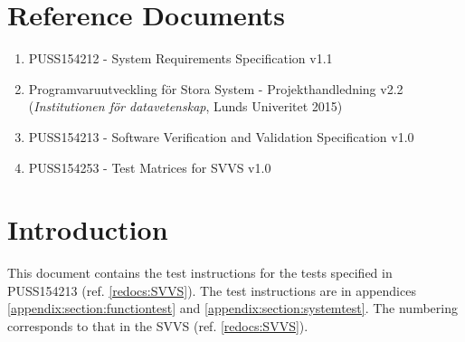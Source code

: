 \documentclass[a4paper]{article}
\begin{document}
\setcounter{tocdepth}{2}
\tableofcontents
\newpage
{}


\section{Reference Documents}
\begin{enumerate}
\item PUSS154212 - System Requirements Specification v1.1 \label{refdocs:srs} 
\item Programvaruutveckling för Stora System - Projekthandledning v2.2 (\textit{Institutionen för datavetenskap}, Lunds Univeritet 2015) \label{refdocs:projekthandledning}
\item PUSS154213 - Software Verification and Validation Specification v1.0 \label{redocs:SVVS}
\item PUSS154253 - Test Matrices for SVVS v1.0 \label{refdocs:matrices}
\end{enumerate}

\section{Introduction}
This document contains the test instructions for the tests specified in PUSS154213 (ref. \ref{redocs:SVVS}). The test instructions are in appendices \ref{appendix:section:functiontest} and \ref{appendix:section:systemtest}. The numbering corresponds to that in the SVVS (ref. \ref{redocs:SVVS}).
\end{document}
